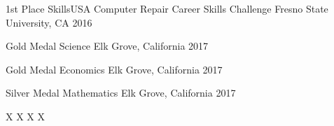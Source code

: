 
\begin{cvhonors}
	\cvhonor
	{1st Place} %
	{SkillsUSA Computer Repair Career Skills Challenge} %
	{Fresno State University, CA} %
	{2016} %
\end{cvhonors}

\begin{cvhonors}
	\cvhonor
	{Gold Medal} %
	{Science} %
	{Elk Grove, California} %
	{2017} %
\end{cvhonors}

\begin{cvhonors}
	\cvhonor
	{Gold Medal} %
	{Economics} %
	{Elk Grove, California} %
	{2017} %
\end{cvhonors}

\begin{cvhonors}
	\cvhonor
	{Silver Medal} %
	{Mathematics} %
	{Elk Grove, California} %
	{2017} %
\end{cvhonors}

\begin{cvhonors}
	\cvhonor
	{X} %
	{X} %
	{X} %
	{X} %
\end{cvhonors}
